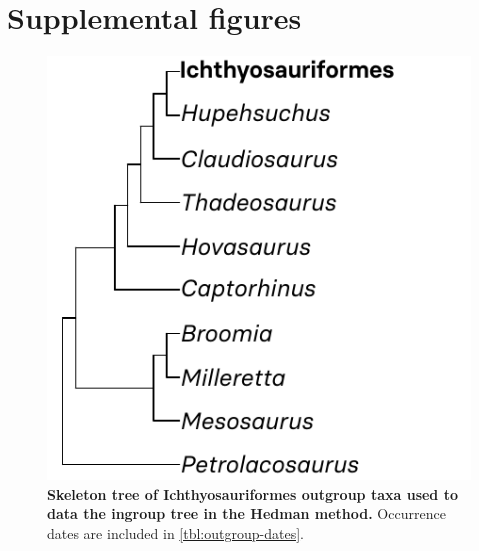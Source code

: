 \documentclass[british,a4paper]{article}
\makeatletter
\renewcommand\listoffigures{%
	    \@starttoc{lof}%
    }
\makeatother
\begin{document}
\section{Supplemental figures}\label{sec:supplemental-figures}

\listoffigures

\begin{figure}[h]
	\includegraphics[center]{supp_figures/outgroup_tre.pdf}
    \caption[Skeleton tree of Ichthyosauriformes outgroup taxa used to date the ingroup tree in the Hedman method]{\textbf{Skeleton tree of Ichthyosauriformes outgroup taxa used to data the ingroup tree in the Hedman method.} Occurrence dates are included in \cref{tbl:outgroup-dates}.\label{fig:hedman-skeleton-tree}}
\end{figure}

\end{document}
